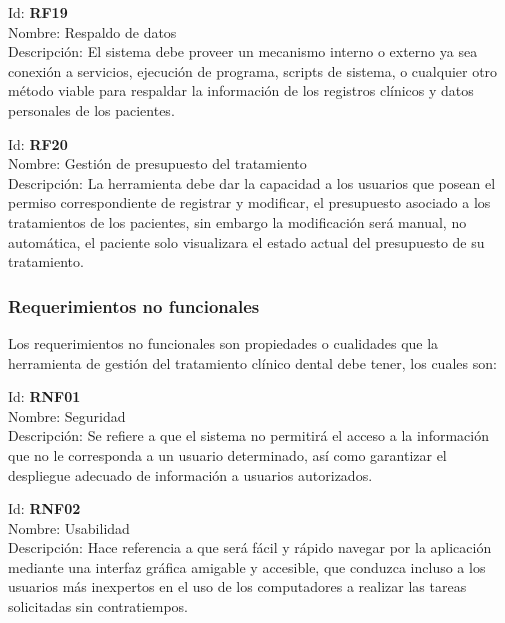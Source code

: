 \vspace{1em}

\noindent Id: \textbf{RF19}\\
Nombre: Respaldo de datos\\
Descripción: El sistema debe proveer un mecanismo interno o externo ya sea conexión a servicios, ejecución de programa, scripts de sistema, o cualquier otro método viable para respaldar la información de los registros clínicos y datos personales de los pacientes.

\vspace{1em}

\noindent Id: \textbf{RF20}\\
Nombre: Gestión de presupuesto del tratamiento\\
Descripción: La herramienta debe dar la capacidad a los usuarios que posean el permiso correspondiente de registrar y modificar, el presupuesto asociado a los tratamientos de los pacientes, sin embargo la modificación será manual, no automática, el paciente solo visualizara el estado actual del presupuesto de su tratamiento.  

\newpage
\subsubsection{Requerimientos no funcionales}

Los requerimientos no funcionales son propiedades o cualidades que la herramienta de gestión del tratamiento clínico dental debe tener, los cuales son:

\vspace{1em}

\noindent Id:  \textbf{RNF01}\\
Nombre: Seguridad\\
Descripción: Se refiere a que el sistema no permitirá el acceso a la información que no le corresponda a un usuario determinado, así como garantizar el despliegue adecuado de información a usuarios autorizados.

\vspace{1em}

\noindent Id:  \textbf{RNF02}\\
Nombre: Usabilidad\\
Descripción: Hace referencia a que será fácil y rápido navegar por la aplicación mediante una interfaz gráfica amigable y accesible, que conduzca incluso a los usuarios más inexpertos en el uso de los computadores a realizar las tareas solicitadas sin contratiempos.


